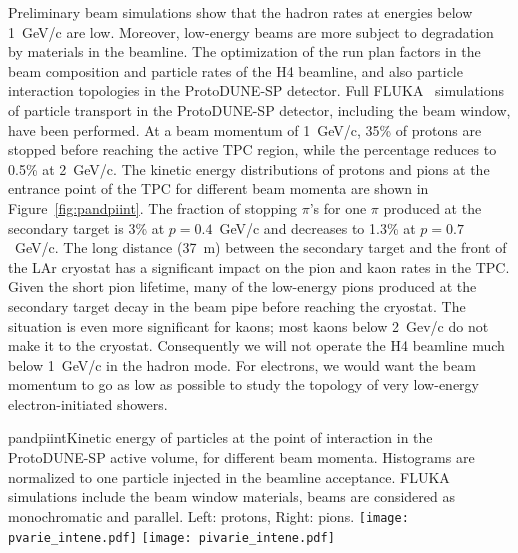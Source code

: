 Preliminary beam simulations show that the hadron rates at 
energies below 1~GeV/c are low. Moreover, low-energy beams are more
subject to degradation by materials in the
beamline.  The optimization of the run plan factors in the beam composition and particle rates of the H4 beamline, and 
also particle interaction topologies in the ProtoDUNE-SP detector. Full FLUKA~%
simulations of particle transport in the ProtoDUNE-SP detector, including the
beam window, have been performed.
%
At a beam momentum of 1~GeV/c, 35\% of protons are stopped before reaching the active TPC region, while the percentage reduces to 0.5\% at 2~GeV/c.  The kinetic energy distributions of protons and pions at the entrance point of the TPC for different beam momenta are shown in Figure~\ref{fig:pandpiint}. 
The fraction of stopping $\pi$'s for one $\pi$
produced at the secondary target is 3\% at $p=0.4$~GeV/c and decreases to 1.3\% at $p=0.7$~GeV/c.
%
The long distance (37~m) between the secondary target and the front of the LAr cryostat has a significant impact on the pion and kaon rates in the TPC. Given the short pion lifetime, many of the  low-energy pions produced at the secondary target decay in the beam pipe before reaching the cryostat. The situation is even more significant for kaons; most kaons below 2~Gev/c do not make it to the cryostat.
Consequently we will not operate the H4 beamline much below 1~GeV/c in the hadron mode.
For electrons, we would want the beam momentum to go as low as possible to study the topology of very low-energy electron-initiated 
showers.
\begin{cdrfigure}{pandpiint}{Kinetic energy of
    particles at the point of interaction in the ProtoDUNE-SP active
    volume, for different beam momenta. Histograms are normalized to one particle injected in the
    beamline acceptance. FLUKA simulations include the beam window
    materials, beams are considered as monochromatic and
    parallel. Left: protons, Right: pions.}
  \texttt{[image: pvarie\_intene.pdf]}
  \texttt{[image: pivarie\_intene.pdf]}
\end{cdrfigure}

